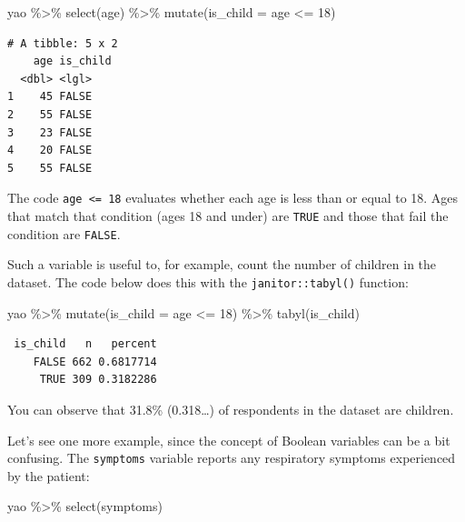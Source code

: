 \documentclass[
  letterpaper,
  DIV=11,
  numbers=noendperiod]{scrreprt}
\newenvironment{Shaded}{\begin{snugshade}}{\end{snugshade}}
\newcommand{\AttributeTok}[1]{\textcolor[rgb]{0.40,0.45,0.13}{#1}}
\newcommand{\DecValTok}[1]{\textcolor[rgb]{0.68,0.00,0.00}{#1}}
\newcommand{\FunctionTok}[1]{\textcolor[rgb]{0.28,0.35,0.67}{#1}}
\newcommand{\NormalTok}[1]{\textcolor[rgb]{0.00,0.23,0.31}{#1}}
\newcommand{\SpecialCharTok}[1]{\textcolor[rgb]{0.37,0.37,0.37}{#1}}
\begin{document}
\begin{Shaded}
\begin{Highlighting}[]
\NormalTok{yao }\SpecialCharTok{\%\textgreater{}\%}
  \FunctionTok{select}\NormalTok{(age) }\SpecialCharTok{\%\textgreater{}\%} 
  \FunctionTok{mutate}\NormalTok{(}\AttributeTok{is\_child =}\NormalTok{ age }\SpecialCharTok{\textless{}=} \DecValTok{18}\NormalTok{)}
\end{Highlighting}
\end{Shaded}

\begin{verbatim}
# A tibble: 5 x 2
    age is_child
  <dbl> <lgl>   
1    45 FALSE   
2    55 FALSE   
3    23 FALSE   
4    20 FALSE   
5    55 FALSE   
\end{verbatim}

The code \texttt{age\ \textless{}=\ 18} evaluates whether each age is
less than or equal to 18. Ages that match that condition (ages 18 and
under) are \texttt{TRUE} and those that fail the condition are
\texttt{FALSE}.

Such a variable is useful to, for example, count the number of children
in the dataset. The code below does this with the
\texttt{janitor::tabyl()} function:

\begin{Shaded}
\begin{Highlighting}[]
\NormalTok{yao }\SpecialCharTok{\%\textgreater{}\%}
  \FunctionTok{mutate}\NormalTok{(}\AttributeTok{is\_child =}\NormalTok{ age }\SpecialCharTok{\textless{}=} \DecValTok{18}\NormalTok{) }\SpecialCharTok{\%\textgreater{}\%} 
  \FunctionTok{tabyl}\NormalTok{(is\_child)}
\end{Highlighting}
\end{Shaded}

\begin{verbatim}
 is_child   n   percent
    FALSE 662 0.6817714
     TRUE 309 0.3182286
\end{verbatim}

You can observe that 31.8\% (0.318\ldots) of respondents in the dataset
are children.

Let's see one more example, since the concept of Boolean variables can
be a bit confusing. The \texttt{symptoms} variable reports any
respiratory symptoms experienced by the patient:

\begin{Shaded}
\begin{Highlighting}[]
\NormalTok{yao }\SpecialCharTok{\%\textgreater{}\%} 
  \FunctionTok{select}\NormalTok{(symptoms)}
\end{Highlighting}
\end{Shaded}
\end{document}
